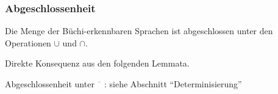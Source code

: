    \begin{frame}
      \frametitle{Abgeschlossenheit}

      \begin{Satz}
        Die Menge der Büchi-erkennbaren Sprachen ist abgeschlossen unter den Operationen
        $\cup$ und $\cap$.
        \label{thm:abgeschlossenheit_v+d}
      \end{Satz}

      \par\medskip
      Direkte Konsequenz aus den folgenden Lemmata.
      
      \par\bigskip
      Abgeschlossenheit unter $\overline{\phantom{o}}$ : siehe Abschnitt "`Determinisierung"'

    \end{frame}

